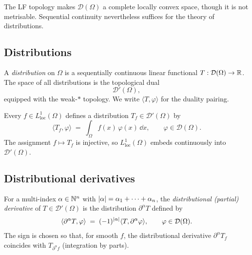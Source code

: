 \begin{remark}
  The LF topology makes $\mathcal{D}(\Omega)$ a complete locally convex space,
  though it is not metrisable.
  Sequential continuity nevertheless suffices for the theory of distributions.
\end{remark}

\subsection{Distributions}

\begin{definition}[Distributions]\label{def:distributions}
  A \emph{distribution} on $\Omega$ is a sequentially continuous linear functional
  $T : \mathcal{D}(\Omega) \to \mathbb{R}$.  The space of all distributions is the topological
  dual
  \[
    \mathcal{D}'(\Omega),
  \]
  equipped with the weak-$*$ topology.  We write $\langle T, \varphi \rangle$ for the
  duality pairing.
\end{definition}

\begin{example}\label{ex:L1loc}
  Every $f \in L^{1}_{\mathrm{loc}}(\Omega)$ defines a distribution $T_{f} \in
  \mathcal{D}'(\Omega)$ by
  \[
    \langle T_{f}, \varphi \rangle
    \;=\;
    \int_{\Omega} f(x)\,\varphi(x)\,\dd x,
    \qquad \varphi \in \mathcal{D}(\Omega).
  \]
  The assignment $f \mapsto T_{f}$ is injective, so $L^{1}_{\mathrm{loc}}(\Omega)$ embeds
  continuously into $\mathcal{D}'(\Omega)$.
\end{example}

\subsection{Distributional derivatives}

\begin{definition}\label{def:distrib-deriv}
  For a multi-index $\alpha \in \mathbb{N}^{n}$ with $\left\lvert \alpha \right\rvert = \alpha_{1} + \cdots +
  \alpha_{n}$, the \emph{distributional (partial) derivative} of $T \in
  \mathcal{D}'(\Omega)$ is the distribution $\partial^{\alpha} T$ defined by
  \[
    \langle \partial^{\alpha} T, \varphi \rangle
    \;=\;
    (-1)^{\left\lvert \alpha \right\rvert}
    \langle T, \partial^{\alpha} \varphi \rangle,
    \qquad \varphi \in \mathcal{D}(\Omega).
  \]
  The sign is chosen so that, for smooth $f$, the distributional derivative $\partial^{\alpha}
  T_{f}$ coincides with $T_{\partial^{\alpha} f}$ (integration by parts).
\end{definition}

